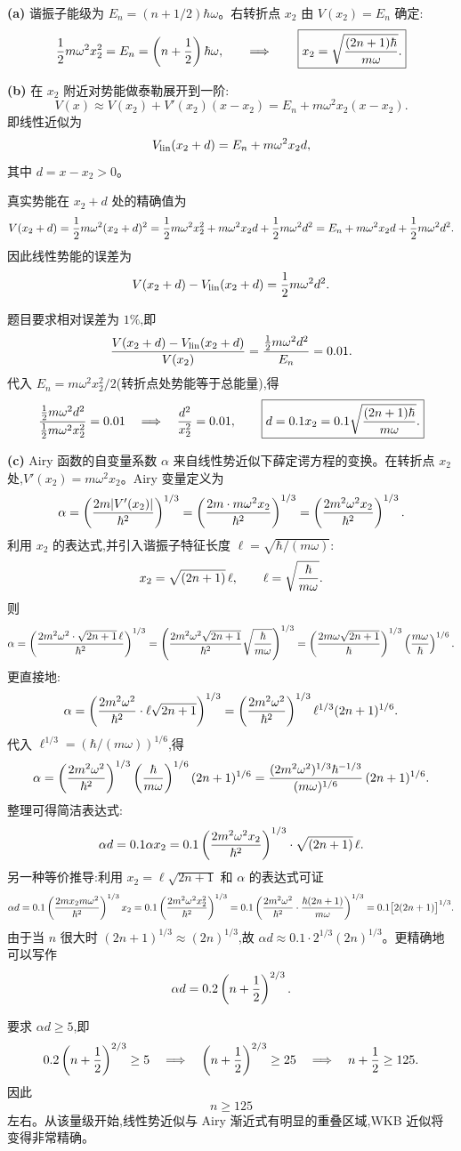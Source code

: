 \begin{solution}
\textbf{(a)} 谐振子能级为 $E_n=(n+1/2)\hbar\omega$。右转折点 $x_2$ 由 $V(x_2)=E_n$ 确定:
\[
{1\over2}m\omega^2x_2^2=E_n=\left(n+{1\over2}\right)\hbar\omega,
\qquad\Longrightarrow\qquad
\boxed{x_2=\sqrt{{(2n+1)\hbar\over m\omega}}.}
\]

\textbf{(b)} 在 $x_2$ 附近对势能做泰勒展开到一阶:
\[
V(x)\approx V(x_2)+V'(x_2)(x-x_2)=E_n+m\omega^2x_2(x-x_2).
\]
即线性近似为
\[
V_{\rm lin}(x_2+d)=E_n+m\omega^2x_2d,
\]
其中 $d=x-x_2>0$。

真实势能在 $x_2+d$ 处的精确值为
\[
V(x_2+d)={1\over2}m\omega^2(x_2+d)^2
={1\over2}m\omega^2x_2^2+m\omega^2x_2d+{1\over2}m\omega^2d^2
=E_n+m\omega^2x_2d+{1\over2}m\omega^2d^2.
\]
因此线性势能的误差为
\[
V(x_2+d)-V_{\rm lin}(x_2+d)={1\over2}m\omega^2d^2.
\]

题目要求相对误差为 $1\%$,即
\[
{V(x_2+d)-V_{\rm lin}(x_2+d)\over V(x_2)}
={{1\over2}m\omega^2d^2\over E_n}=0.01.
\]
代入 $E_n=m\omega^2x_2^2/2$(转折点处势能等于总能量),得
\[
{{1\over2}m\omega^2d^2\over{1\over2}m\omega^2x_2^2}=0.01
\quad\Longrightarrow\quad
{d^2\over x_2^2}=0.01,
\qquad
\boxed{d=0.1x_2=0.1\sqrt{{(2n+1)\hbar\over m\omega}}.}
\]

\textbf{(c)} Airy 函数的自变量系数 $\alpha$ 来自线性势近似下薛定谔方程的变换。在转折点 $x_2$ 处,$V'(x_2)=m\omega^2x_2$。Airy 变量定义为
\[
\alpha=\left({2m|V'(x_2)|\over\hbar^2}\right)^{1/3}
=\left({2m\cdot m\omega^2x_2\over\hbar^2}\right)^{1/3}
=\left({2m^2\omega^2x_2\over\hbar^2}\right)^{1/3}.
\]
利用 $x_2$ 的表达式,并引入谐振子特征长度 $\ell=\sqrt{\hbar/(m\omega)}$:
\[
x_2=\sqrt{(2n+1)}\,\ell,\qquad
\ell=\sqrt{\hbar\over m\omega}.
\]
则
\[
\alpha=\left({2m^2\omega^2\cdot\sqrt{2n+1}\,\ell\over\hbar^2}\right)^{1/3}
=\left({2m^2\omega^2\sqrt{2n+1}\over\hbar^2}\sqrt{\hbar\over m\omega}\right)^{1/3}
=\left({2m\omega\sqrt{2n+1}\over\hbar}\right)^{1/3}
\left({m\omega\over\hbar}\right)^{1/6}.
\]
更直接地:
\[
\alpha=\left({2m^2\omega^2\over\hbar^2}\cdot\ell\sqrt{2n+1}\right)^{1/3}
=\left({2m^2\omega^2\over\hbar^2}\right)^{1/3}
\ell^{1/3}(2n+1)^{1/6}.
\]
代入 $\ell^{1/3}=(\hbar/(m\omega))^{1/6}$,得
\[
\alpha=\left({2m^2\omega^2\over\hbar^2}\right)^{1/3}
\left({\hbar\over m\omega}\right)^{1/6}(2n+1)^{1/6}
={ (2m^2\omega^2)^{1/3}\hbar^{-1/3}\over (m\omega)^{1/6}}\,(2n+1)^{1/6}.
\]
整理可得简洁表达式:
\[
\alpha d=0.1\alpha x_2=0.1\left({2m^2\omega^2x_2\over\hbar^2}\right)^{1/3}
\cdot\sqrt{(2n+1)}\,\ell.
\]
另一种等价推导:利用 $x_2=\ell\sqrt{2n+1}$ 和 $\alpha$ 的表达式可证
\[
\alpha d=0.1\left({2mx_2m\omega^2\over\hbar^2}\right)^{1/3}x_2
=0.1\left({2m^2\omega^2x_2^2\over\hbar^2}\right)^{1/3}
=0.1\left({2m^2\omega^2\over\hbar^2}\cdot{\hbar(2n+1)\over m\omega}\right)^{1/3}
=0.1\bigl[2(2n+1)\bigr]^{1/3}.
\]
由于当 $n$ 很大时 $(2n+1)^{1/3}\approx(2n)^{1/3}$,故 $\alpha d\approx0.1\cdot2^{1/3}(2n)^{1/3}$。更精确地可以写作
\[
\alpha d=0.2\left(n+{1\over2}\right)^{2/3}.
\]

要求 $\alpha d\ge5$,即
\[
0.2\left(n+{1\over2}\right)^{2/3}\ge5
\quad\Longrightarrow\quad
\left(n+{1\over2}\right)^{2/3}\ge25
\quad\Longrightarrow\quad
n+{1\over2}\ge125.
\]
因此
\[
\boxed{n\ge125}
\]
左右。从该量级开始,线性势近似与 Airy 渐近式有明显的重叠区域,WKB 近似将变得非常精确。
\end{solution}

